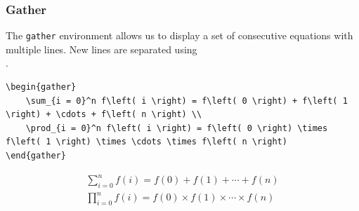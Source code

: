\documentclass[11pt, twoside]{article}
\begin{document}
\subsubsection{Gather}
The \texttt{gather} environment allows us to display a set of consecutive equations with multiple lines.
New lines are separated using \texttt{\\}.
\begin{verbatim}
\begin{gather}
    \sum_{i = 0}^n f\left( i \right) = f\left( 0 \right) + f\left( 1 \right) + \cdots + f\left( n \right) \\
    \prod_{i = 0}^n f\left( i \right) = f\left( 0 \right) \times f\left( 1 \right) \times \cdots \times f\left( n \right)
\end{gather}
\end{verbatim}
\begin{outputbox}
    \begin{gather}
        \sum_{i = 0}^n f\left( i \right) = f\left( 0 \right) + f\left( 1 \right) + \cdots + f\left( n \right) \\
        \prod_{i = 0}^n f\left( i \right) = f\left( 0 \right) \times f\left( 1 \right) \times \cdots \times f\left( n \right)
    \end{gather}
\end{outputbox}
\newpage
\end{document}
